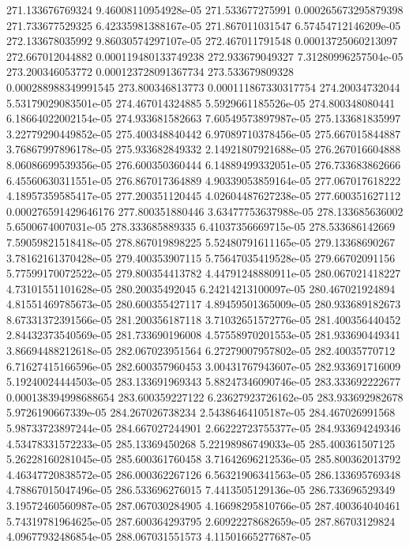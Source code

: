 {271.133676769324 9.46008110954928e-05
271.533677275991 0.000265673295879398
271.733677529325 6.42335981388167e-05
271.867011031547 6.57454712146209e-05
272.133678035992 9.86030574297107e-05
272.467011791548 0.00013725060213097
272.667012044882 0.000119480133749238
272.933679049327 7.31280996257504e-05
273.200346053772 0.000123728091367734
273.533679809328 0.000288988349991545
273.800346813773 0.000111867330317754
274.20034732044 5.53179029083501e-05
274.467014324885 5.5929661185526e-05
274.800348080441 6.18664022002154e-05
274.933681582663 7.60549573897987e-05
275.133681835997 3.22779290449852e-05
275.400348840442 6.97089710378456e-05
275.667015844887 3.76867997896178e-05
275.933682849332 2.14921807921688e-05
276.267016604888 8.06086699539356e-05
276.600350360444 6.14889499332051e-05
276.733683862666 6.45560630311551e-05
276.867017364889 4.90339053859164e-05
277.067017618222 4.18957359585417e-05
277.200351120445 4.02604487627238e-05
277.600351627112 0.000276591429646176
277.800351880446 3.63477753637988e-05
278.133685636002 5.6500674007031e-05
278.333685889335 6.41037356669715e-05
278.533686142669 7.59059821518418e-05
278.867019898225 5.52480791611165e-05
279.13368690267 3.78162161370428e-05
279.400353907115 5.75647035419528e-05
279.66702091156 5.77599170072522e-05
279.800354413782 4.44791248880911e-05
280.067021418227 4.73101551101628e-05
280.20035492045 6.24214213100097e-05
280.467021924894 4.81551469785673e-05
280.600355427117 4.89459501365009e-05
280.933689182673 8.67331372391566e-05
281.200356187118 3.71032651572776e-05
281.400356440452 2.84432373540569e-05
281.733690196008 4.57558970201553e-05
281.933690449341 3.86694488212618e-05
282.067023951564 6.27279007957802e-05
282.40035770712 6.71627415166596e-05
282.600357960453 3.00431767943607e-05
282.933691716009 5.19240024444503e-05
283.133691969343 5.88247346090746e-05
283.333692222677 0.000138394998688654
283.600359227122 6.23627923726162e-05
283.933692982678 5.9726190667339e-05
284.267026738234 2.54386464105187e-05
284.467026991568 5.98733723897244e-05
284.667027244901 2.66222723755377e-05
284.933694249346 4.53478331572233e-05
285.13369450268 5.22198986749033e-05
285.400361507125 5.26228160281045e-05
285.600361760458 3.71642696212536e-05
285.800362013792 4.46347720838572e-05
286.000362267126 6.56321906341563e-05
286.133695769348 4.78867015047496e-05
286.533696276015 7.4413505129136e-05
286.733696529349 3.19572460560987e-05
287.067030284905 4.16698295810766e-05
287.400364040461 5.74319781964625e-05
287.600364293795 2.60922278682659e-05
287.86703129824 4.09677932486854e-05
288.067031551573 4.11501665277687e-05
}
